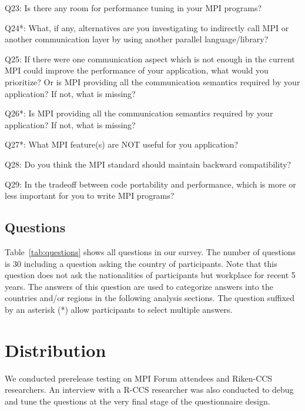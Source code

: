 \documentclass[submit,techrep,noauthor,english]{ipsj}
\begin{document}
\begin{table}
\begin{description}
\item{Q23:} Is there any room for performance tuning in your MPI
  programs? 
\item{Q24*:} What, if any, alternatives are you investigating to
  indirectly call MPI or another communication layer by using another
  parallel language/library? 
\item{Q25:} If there were one communication aspect which is not enough
  in the current MPI could improve the performance of your
  application, what would you prioritize? Or is MPI providing all the
  communication semantics required by your application? If not, what
  is missing? 
\item{Q26*:} Is MPI providing all the communication semantics required
  by your application? If not, what is missing? 
\item{Q27*:} What MPI feature(s) are NOT useful for you application? 
\item{Q28:} Do you think the MPI standard should maintain backward
  compatibility? 
\item{Q29:} In the tradeoff between code portability and performance,
  which is more or less important for you to write MPI programs? 
\end{description}
\end{table}

\subsection{Questions}

Table~\ref{tab:questions} shows all questions in our survey. The
number of questions is 30 including a question asking the country of
participants. Note that this question does not ask the nationalities
of participants but workplace for recent 5 years. The answers of this
question are used to categorize answers into the countries and/or
regions in the following analysis sections. The question suffixed by
an asterisk (*) allow participants to select multiple answers. 

\section{Distribution}

We conducted prerelease testing on MPI Forum\cite{mpi-forum} attendees
and Riken-CCS researchers. An interview with a R-CCS
researcher was also conducted to debug and tune the questions at the
very final stage of the questionnaire design.
\end{document}
